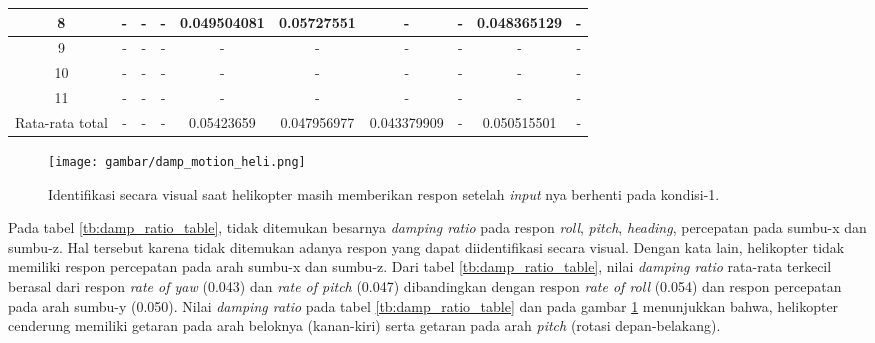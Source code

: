 \begin{table}[H]
{\begin{tabular}{|c|ccccccccc|}
			8 & \multicolumn{1}{c|}{-} & \multicolumn{1}{c|}{-} & \multicolumn{1}{c|}{-} & \multicolumn{1}{c|}{0.049504081} & \multicolumn{1}{c|}{0.05727551} & \multicolumn{1}{c|}{-} & \multicolumn{1}{c|}{-} & \multicolumn{1}{c|}{0.048365129} & - \\ \hline
			9 & \multicolumn{1}{c|}{-} & \multicolumn{1}{c|}{-} & \multicolumn{1}{c|}{-} & \multicolumn{1}{c|}{-} & \multicolumn{1}{c|}{-} & \multicolumn{1}{c|}{-} & \multicolumn{1}{c|}{-} & \multicolumn{1}{c|}{-} & - \\ \hline
			10 & \multicolumn{1}{c|}{-} & \multicolumn{1}{c|}{-} & \multicolumn{1}{c|}{-} & \multicolumn{1}{c|}{-} & \multicolumn{1}{c|}{-} & \multicolumn{1}{c|}{-} & \multicolumn{1}{c|}{-} & \multicolumn{1}{c|}{-} & - \\ \hline
			11 & \multicolumn{1}{c|}{-} & \multicolumn{1}{c|}{-} & \multicolumn{1}{c|}{-} & \multicolumn{1}{c|}{-} & \multicolumn{1}{c|}{-} & \multicolumn{1}{c|}{-} & \multicolumn{1}{c|}{-} & \multicolumn{1}{c|}{-} & - \\ \hline
			Rata-rata total & \multicolumn{1}{c|}{-} & \multicolumn{1}{c|}{-} & \multicolumn{1}{c|}{-} & \multicolumn{1}{c|}{0.05423659} & \multicolumn{1}{c|}{0.047956977} & \multicolumn{1}{c|}{0.043379909} & \multicolumn{1}{c|}{-} & \multicolumn{1}{c|}{0.050515501} & - \\ \hline
		\end{tabular}%
	}
\end{table}

\begin{figure}[H]
	\centering
	\texttt{[image: gambar/damp\_motion\_heli.png]}
	\caption{Identifikasi secara visual saat helikopter masih memberikan respon setelah \textit{input} nya berhenti pada kondisi-1.}
	\label{fig:damp_motion_heli}
\end{figure}

Pada tabel \ref{tb:damp_ratio_table}, tidak ditemukan besarnya \textit{damping ratio} pada respon \textit{roll}, \textit{pitch}, \textit{heading}, percepatan pada sumbu-x dan sumbu-z. Hal tersebut karena tidak ditemukan adanya respon yang dapat diidentifikasi secara visual. Dengan kata lain, helikopter tidak memiliki respon percepatan pada arah sumbu-x dan sumbu-z. Dari tabel \ref{tb:damp_ratio_table}, nilai \textit{damping ratio} rata-rata terkecil berasal dari respon \textit{rate of yaw} (0.043) dan \textit{rate of pitch} (0.047) dibandingkan dengan respon \textit{rate of roll} (0.054) dan respon percepatan pada arah sumbu-y (0.050). Nilai \textit{damping ratio} pada tabel \ref{tb:damp_ratio_table} dan pada gambar \ref{fig:damp_motion_heli} menunjukkan bahwa, helikopter cenderung memiliki getaran pada arah beloknya (kanan-kiri) serta getaran pada arah \textit{pitch} (rotasi depan-belakang).

